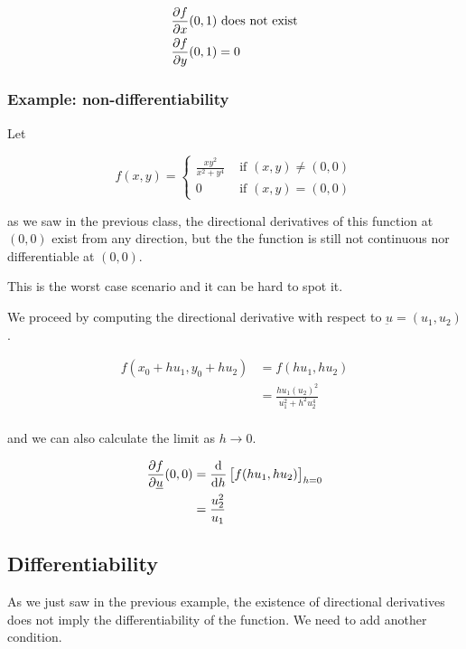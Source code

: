\documentclass[10pt]{extarticle}
\renewcommand{\vec}[1]{\underbar{\ensuremath{#1}}}
\begin{document}
\begin{align*}
    \pdv{f}{x}()(0, 1) & \text{ does not exist} \\
    \pdv{f}{y}()(0, 1) & = 0
\end{align*}

\subsubsection{Example: non-differentiability}

Let

$$
    f(x, y) = \begin{cases}
        \frac{x y^2}{x^2 + y^4} & \text{ if } (x, y) \neq (0, 0) \\
        0                       & \text{ if } (x, y) = (0, 0)
    \end{cases}
$$

as we saw in the previous class, the directional derivatives of this function at $(0, 0)$ exist from any direction, but the the function is still not continuous nor differentiable at $(0, 0)$.

This is the worst case scenario and it can be hard to spot it.

We proceed by computing the directional derivative with respect to $\vec{u} = (u_1, u_2)$.

\begin{align*}
    f(x_0 + hu_1, y_0 + hu_2) & = f(hu_1, hu_2)                         \\
                              & = \frac{hu_1(u_2)^2}{u_1^2 + h^2 u_2^4} \\
\end{align*}

and we can also calculate the limit as $h \to 0$.

\begin{align*}
    \pdv{f}{\vec{u}}()(0, 0) & = \dv{h} \left[ f(hu_1, hu_2) \right]_{h = 0} \\
                                   & = \frac{u_2^2}{u_1}                           \\
\end{align*}

\subsection{Differentiability}

As we just saw in the previous example, the existence of directional derivatives does not imply the differentiability of the function.
We need to add another condition.
\end{document}
